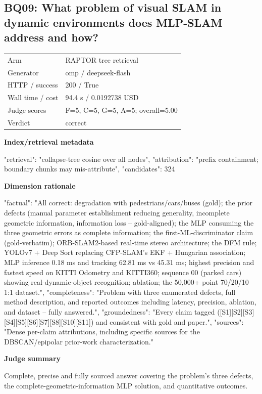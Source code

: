 \documentclass[10pt]{article}
\begin{document}
\subsection{BQ09: What problem of visual SLAM in dynamic environments does MLP-SLAM address and how?}
\begin{tabular}{@{}ll@{}}
Arm & RAPTOR tree retrieval\\
Generator & omp / deepseek-flash\\
HTTP / success & 200 / True\\
Wall time / cost & 94.4 s / 0.0192738 USD\\
Judge scores & F=5, C=5, G=5, A=5; overall=5.00\\
Verdict & correct\\
\end{tabular}

\textbf{Index/retrieval metadata}
\begin{EvidenceText}
{
  "retrieval": "collapse-tree cosine over all nodes",
  "attribution": "prefix containment; boundary chunks may mis-attribute",
  "candidates": 324
}
\end{EvidenceText}

\textbf{Dimension rationale}
\begin{EvidenceText}
{
  "factual": "All correct: degradation with pedestrians/cars/buses (gold); the prior defects (manual parameter establishment reducing generality, incomplete geometric information, information loss -- gold-aligned); the MLP consuming the three geometric errors as complete information; the first-ML-discriminator claim (gold-verbatim); ORB-SLAM2-based real-time stereo architecture; the DFM rule; YOLOv7 + Deep Sort replacing CFP-SLAM's EKF + Hungarian association; MLP inference 0.18 ms and tracking 62.81 ms vs 45.31 ms; highest precision and fastest speed on KITTI Odometry and KITTI360; sequence 00 (parked cars) showing real-dynamic-object recognition; ablation; the 50,000+ point 70/20/10 1:1 dataset.",
  "completeness": "Problem with three enumerated defects, full method description, and reported outcomes including latency, precision, ablation, and dataset -- fully answered.",
  "groundedness": "Every claim tagged ([S1][S2][S3][S4][S5][S6][S7][S8][S10][S11]) and consistent with gold and paper.",
  "sources": "Dense per-claim attributions, including specific sources for the DBSCAN/epipolar prior-work characterization."
}
\end{EvidenceText}

\textbf{Judge summary}
\begin{EvidenceText}
Complete, precise and fully sourced answer covering the problem's three defects, the complete-geometric-information MLP solution, and quantitative outcomes.
\end{EvidenceText}
\end{document}
